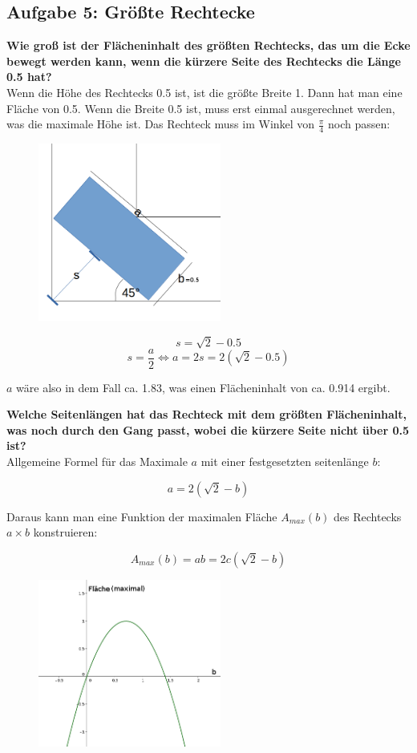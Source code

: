 \documentclass[a4paper,11pt]{article}
\begin{document}
\subsection{Aufgabe 5: Gr\"o\ss te Rechtecke}

\textbf{Wie groß ist der Flächeninhalt des größten Rechtecks, das um die Ecke bewegt werden kann,
wenn die kürzere Seite des Rechtecks die Länge 0.5 hat?} \\
Wenn die H\"ohe des Rechtecks 0.5 ist, ist die gr\"o\ss te Breite 1. Dann hat man eine Fl\"ache von 0.5.
Wenn die Breite 0.5 ist, muss erst einmal ausgerechnet werden, was die maximale H\"ohe ist. Das Rechteck muss im Winkel von $\frac{\pi}{4}$ noch passen: 

\begin{figure}[H] 
        \centering
        \includegraphics[width=6cm]{img/A5_1.png}
\end{figure}

\[ s = \sqrt{2} - 0.5 \]
\[ s = \frac{a}{2} \Leftrightarrow a = 2s = 2(\sqrt{2}-0.5) \]

$a$ w\"are also in dem Fall ca. 1.83, was einen Fl\"acheninhalt von ca. 0.914 ergibt.

\textbf{Welche Seitenl\"angen hat das Rechteck mit dem gr\"o\ss ten Fl\"acheninhalt, was noch durch den Gang passt, wobei die k\"urzere Seite nicht \"uber 0.5 ist?} \\
Allgemeine Formel f\"ur das Maximale $a$ mit einer festgesetzten seitenl\"ange $b$:

\[ a = 2(\sqrt{2}-b) \]

Daraus kann man eine Funktion der maximalen Fl\"ache $A_{max}(b)$ des Rechtecks $a \times b$ konstruieren:

\[ A_{max}(b) = a b = 2c(\sqrt{2}-b) \]

\begin{figure}[H] 
        \centering
        \includegraphics[width=6cm]{img/A5_2.png}
\end{figure}
\end{document}
